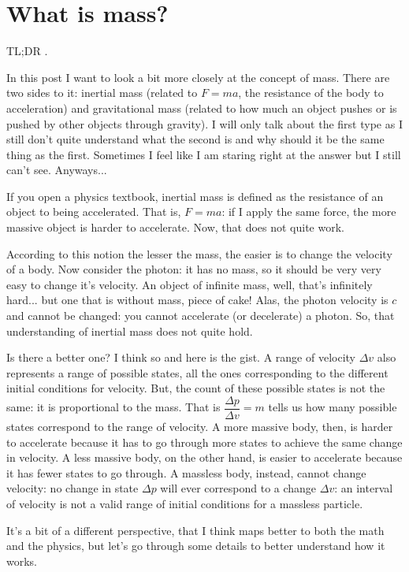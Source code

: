 \documentclass[aps,pra,10pt,floatfix,nofootinbib]{revtex4-1}
\theoremstyle{definition}
\begin{document}
	
\section{What is mass?}

TL;DR .

In this post I want to look a bit more closely at the concept of mass. There are two sides to it: inertial mass (related to $F=ma$, the resistance of the body to acceleration) and gravitational mass (related to how much an object pushes or is pushed by other objects through gravity). I will only talk about the first type as I still don't quite understand what the second is and why should it be the same thing as the first. Sometimes I feel like I am staring right at the answer but I still can't see. Anyways...

If you open a physics textbook, inertial mass is defined as the resistance of an object to being accelerated. That is, $F=ma$: if I apply the same force, the more massive object is harder to accelerate. Now, that does not quite work.

According to this notion the lesser the mass, the easier is to change the velocity of a body. Now consider the photon: it has no mass, so it should be very very easy to change it's velocity. An object of infinite mass, well, that's infinitely hard... but one that is without mass, piece of cake! Alas, the photon velocity is $c$ and cannot be changed: you cannot accelerate (or decelerate) a photon. So, that understanding of inertial mass does not quite hold.

Is there a better one? I think so and here is the gist. A range of velocity $\Delta v$ also represents a range of possible states, all the ones corresponding to the different initial conditions for velocity. But, the count of these possible states is not the same: it is proportional to the mass. That is $\dfrac{\Delta p}{\Delta v} = m$ tells us how many possible states correspond to the range of velocity. A more massive body, then, is harder to accelerate because it has to go through more states to achieve the same change in velocity. A less massive body, on the other hand, is easier to accelerate because it has fewer states to go through. A massless body, instead, cannot change velocity: no change in state $\Delta p$ will ever correspond to a change $\Delta v$: an interval of velocity is not a valid range of initial conditions for a massless particle.

It's a bit of a different perspective, that I think maps better to both the math and the physics, but let's go through some details to better understand how it works.
\end{document}
